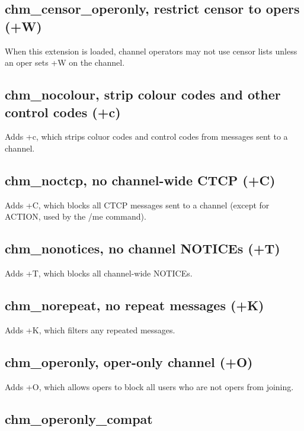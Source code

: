 \subsection{chm\_censor\_operonly, restrict censor to opers (+W)}

	When this extension is loaded, channel operators may not use censor
	lists unless an oper sets +W on the channel.


\subsection{chm\_nocolour, strip colour codes and other control codes (+c)}

	Adds +c, which strips coluor codes and control codes from messages
	sent to a channel.

\subsection{chm\_noctcp, no channel-wide CTCP (+C)}

	Adds +C, which blocks all CTCP messages sent to a channel (except
	for ACTION, used by the /me command).

\subsection{chm\_nonotices, no channel NOTICEs (+T)}

	Adds +T, which blocks all channel-wide NOTICEs.

\subsection{chm\_norepeat, no repeat messages (+K)}

	Adds +K, which filters any repeated messages.

\subsection{chm\_operonly, oper-only channel (+O)}

	Adds +O, which allows opers to block all users who are not opers
	from joining.

\subsection{chm\_operonly\_compat}


